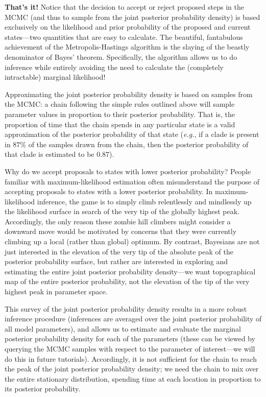 \textbf{That's it!} Notice that the decision to accept or reject proposed steps in the MCMC (and thus to sample from the joint posterior probability density) is based exclusively on the likelihood and prior probability of the proposed and current states---two quantities that are easy to calculate. 
The beautiful, fantabulous achievement of the Metropolis-Hastings algorithm is the slaying of the beastly denominator of Bayes' theorem. 
Specifically, the algorithm allows us to do inference while entirely avoiding the need to calculate the (completely intractable) marginal likelihood!

Approximating the joint posterior probability density is based on samples from the MCMC: a chain following the simple rules outlined above will sample parameter values in proportion to their posterior probability. 
That is, the proportion of time that the chain spends in any particular state is a valid approximation of the posterior probability of that state ({\it e.g.}, if a clade is present in $87\%$ of the samples drawn from the chain, then the posterior probability of that clade is estimated to be $0.87$).

Why do we accept proposals to states with lower posterior probability? 
People familiar with maximum-likelihood estimation often misunderstand the purpose of accepting proposals to states with a lower posterior probability. 
In maximum-likelihood inference, the game is to simply climb relentlessly and mindlessly up the likelihood surface in search of the very tip of the globally highest peak. 
Accordingly, the only reason these zombie hill climbers might consider a downward move would be motivated by concerns that they were currently climbing up a local (rather than global) optimum. 
By contrast, Bayesians are not just interested in the elevation of the very tip of the absolute peak of the posterior probability surface, but rather are interested in exploring and estimating the entire joint posterior probability density---we want topographical map of the entire posterior probability, not the elevation of the tip of the very highest peak in parameter space.

This survey of the joint posterior probability density results in a more robust inference procedure (inferences are averaged over the joint posterior probability of all model parameters), and allows us to estimate and evaluate the marginal posterior probability density for each of the parameters (these can be viewed by querying the MCMC samples with respect to the parameter of interest---we will do this in future tutorials). 
Accordingly, it is not sufficient for the chain to reach the peak of the joint posterior probability density; we need the chain to mix over the entire stationary distribution, spending time at each location in proportion to its posterior probability.

